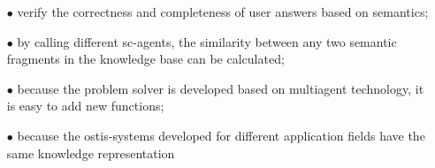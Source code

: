\documentclass{report}
\begin{document}
\begin{small}
\begin{multicols}{2}
\begin{itemize}
  \item[$\bullet$] verify the correctness and completeness of user answers
  based on semantics;
  \item[$\bullet$] by calling different sc-agents, the similarity between any
  two semantic fragments in the knowledge base can be
  calculated;
  \item[$\bullet$] because the problem solver is developed based on multiagent technology, it is easy to add new functions;
  \item[$\bullet$] because the ostis-systems developed for different application fields have the same knowledge representation
  \end{itemize}

\end{multicols}

\end{small}
\end{document}
